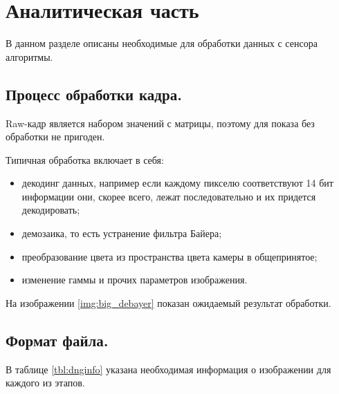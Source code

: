 \chapter{Аналитическая часть}

В данном разделе описаны необходимые для обработки данных с сенсора алгоритмы.

\section{Процесс обработки кадра.}

Raw-кадр является набором значений с матрицы, поэтому для показа без обработки не пригоден.

Типичная обработка включает в себя:
\begin{itemize}
	\item декодинг данных, например если каждому пикселю соответствуют 14 бит информации они, скорее всего, лежат последовательно и их придется декодировать;
	\item демозаика, то есть устранение фильтра Байера;
	\item преобразование цвета из пространства цвета камеры в общепринятое;
	\item изменение гаммы и прочих параметров изображения.
\end{itemize}

На изображении \ref{img:big_debayer} показан ожидаемый результат обработки.


\section{Формат файла.}

В таблице \ref{tbl:dnginfo} указана необходимая информация о изображении для каждого из этапов.

\begin{table}[h]
	\begin{center}
		\caption{Используемая информация о изображении.}
		\label{tbl:dnginfo}
	\end{center}
\end{table}

